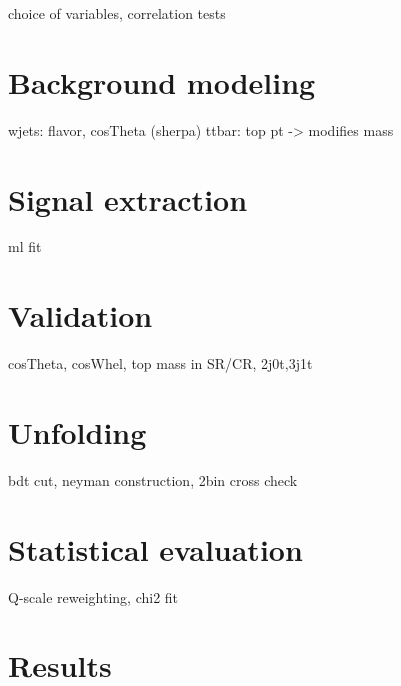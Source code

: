 choice of variables, correlation tests

\section{Background modeling}

wjets: flavor, cosTheta (sherpa)
ttbar: top pt -> modifies mass



\section{Signal extraction}
\label{sec:polarization-fit}

ml fit 



\section{Validation}

cosTheta, cosWhel, top mass in SR/CR, 2j0t,3j1t

\section{Unfolding}

bdt cut, neyman construction, 2bin cross check

\section{Statistical evaluation}

Q-scale reweighting, chi2 fit

\section{Results}

